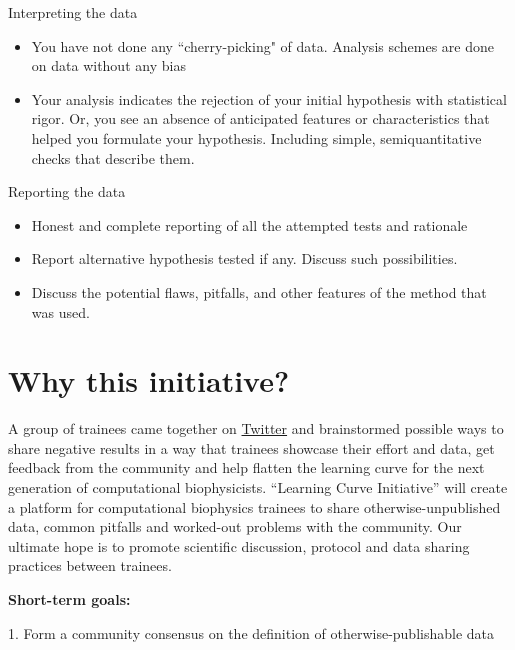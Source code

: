 \documentclass[9pt,lessons]{livecoms}
\theoremstyle{definition}
\theoremstyle{remark}
\begin{document}
\begin{Checklists*}[p!]
\begin{checklist}{Interpreting the data}
\begin{itemize}
\item You have not done any ``cherry-picking" of data. Analysis schemes are done on data without any bias
\item Your analysis indicates the rejection of your initial hypothesis with statistical rigor.
Or, you see an absence of anticipated features or characteristics that helped you formulate your hypothesis.
Including simple, semiquantitative checks that describe them.
\end{itemize}
\end{checklist}

\begin{checklist}{Reporting the data}
\begin{itemize}
\item Honest and complete reporting of all the attempted tests and rationale
\item Report alternative hypothesis tested if any. Discuss such possibilities.
\item Discuss the potential flaws, pitfalls, and other features of the method that was used.
\end{itemize}
\end{checklist}

\end{Checklists*}

\section{Why this initiative?}

A group of trainees came together on \href{https://twitter.com/poruthoor/status/1635740205373087744?s=20}{Twitter} and brainstormed possible ways to share negative results 
in a way that trainees showcase their effort and data, get feedback from the community and help flatten the learning curve for the next generation of computational 
biophysicists. “Learning Curve Initiative” will create a platform for computational biophysics trainees to share otherwise-unpublished data, common 
pitfalls and worked-out problems with the community. Our ultimate hope is to promote scientific discussion, protocol and data sharing practices between trainees.

\textbf{Short-term goals:}

1. Form a community consensus on the definition of otherwise-publishable data
\end{document}
